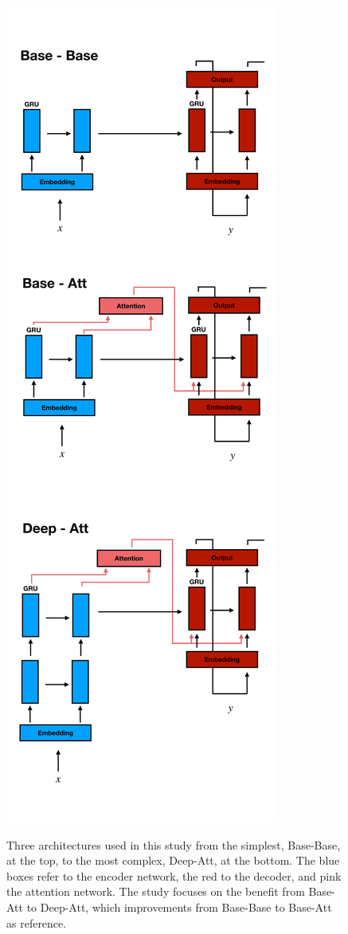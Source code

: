 \documentclass[twocolumn,superscriptaddress]{revtex4-1}
\begin{document}
\begin{figure}
\includegraphics[scale = 0.15]{../plots/architecture.pdf}
\label{fig:architectures}
\caption{
Three architectures used in this study from the simplest, Base-Base, at the top, to the most complex, Deep-Att, at the bottom.
The blue boxes refer to the encoder network, the red to the decoder, and pink the attention network.
The study focuses on the benefit from Base-Att to Deep-Att, which improvements from Base-Base to Base-Att as reference.
} 
\end{figure}
\end{document}

